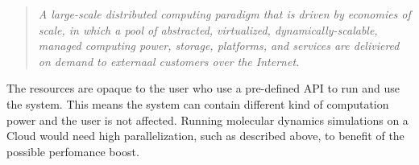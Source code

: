 \begin{quote} \slshape
  A large-scale distributed computing paradigm that is driven by
  economies of scale, in which a pool of abstracted, virtualized,
  dynamically-scalable, managed computing power, storage, platforms,
  and services are deliviered on demand to externaal customers over
  the Internet.
\end{quote}

The resources are opaque to the user who use a pre-defined API to run
and use the system. This means the system can contain different kind
of computation power and the user is not affected. Running molecular
dynamics simulations on a Cloud would need high parallelization, such
as described above, to benefit of the possible perfomance boost.











